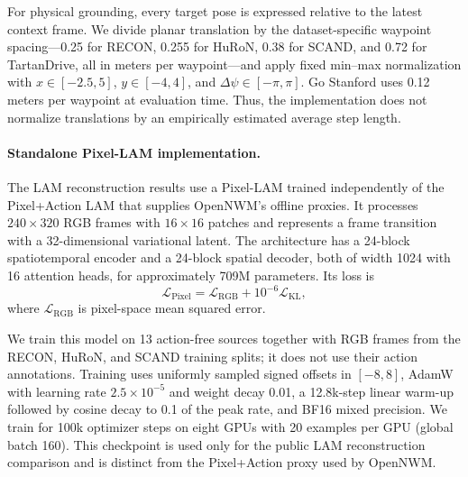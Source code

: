 For physical grounding, every target pose is expressed relative to the latest
context frame.  We divide planar translation by the dataset-specific waypoint
spacing---0.25 for RECON, 0.255 for HuRoN, 0.38 for SCAND, and 0.72 for
TartanDrive, all in meters per waypoint---and apply fixed min--max
normalization with
$x\in[-2.5,5]$, $y\in[-4,4]$, and
$\Delta\psi\in[-\pi,\pi]$.  Go Stanford uses 0.12 meters per waypoint at
evaluation time.  Thus, the implementation does not normalize translations by
an empirically estimated average step length.

\paragraph{Standalone Pixel-LAM implementation.}
The LAM reconstruction results use a Pixel-LAM trained independently of the
Pixel+Action LAM that supplies OpenNWM's offline proxies.  It processes
$240\times320$ RGB frames with $16\times16$ patches and represents a frame
transition with a 32-dimensional variational latent.  The architecture has a
24-block spatiotemporal encoder and a 24-block spatial decoder, both of width
1024 with 16 attention heads, for approximately 709M parameters.  Its loss is
\begin{equation}
    \mathcal{L}_{\mathrm{Pixel}}
    = \mathcal{L}_{\mathrm{RGB}}
    + 10^{-6}\mathcal{L}_{\mathrm{KL}},
\end{equation}
where $\mathcal{L}_{\mathrm{RGB}}$ is pixel-space mean squared error.

We train this model on 13 action-free sources together with RGB frames from
the RECON, HuRoN, and SCAND training splits; it does not use their
action annotations.  Training uses uniformly sampled signed offsets in
$[-8,8]$, AdamW with learning rate $2.5\times10^{-5}$ and weight decay 0.01,
a 12.8k-step linear warm-up followed by cosine decay to 0.1 of the peak rate,
and BF16 mixed precision.  We train for 100k optimizer steps on eight GPUs
with 20 examples per GPU (global batch 160).  This checkpoint is used only for
the public LAM reconstruction comparison and is distinct from the Pixel+Action
proxy used by OpenNWM.

